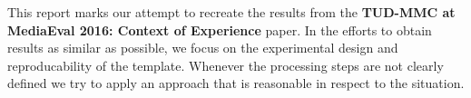 This report marks our attempt to recreate the results from the \textbf{TUD-MMC at MediaEval 2016: Context of Experience}\cite{Wang2016} paper. In the efforts to obtain results as similar as possible, we focus on the experimental design and reproducability of the template. Whenever the processing steps are not clearly defined we try to apply an approach that is reasonable in respect to the situation.